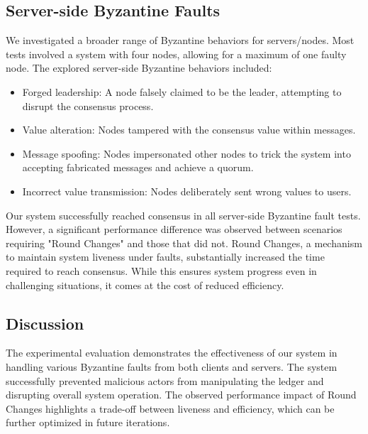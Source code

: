\subsection{Server-side Byzantine Faults} We investigated a broader range of Byzantine behaviors for servers/nodes. Most tests involved a system with four nodes, allowing for a maximum of one faulty node. The explored server-side Byzantine behaviors included:
    \begin{itemize}
        \item Forged leadership: A node falsely claimed to be the leader, attempting to disrupt the consensus process.
        \item Value alteration: Nodes tampered with the consensus value within messages.
        \item Message spoofing: Nodes impersonated other nodes to trick the system into accepting fabricated messages and achieve a quorum.
        \item Incorrect value transmission: Nodes deliberately sent wrong values to users.
    \end{itemize}

Our system successfully reached consensus in all server-side Byzantine fault tests. However, a significant performance difference was observed between scenarios requiring "Round Changes" and those that did not. Round Changes, a mechanism to maintain system liveness under faults, substantially increased the time required to reach consensus. While this ensures system progress even in challenging situations, it comes at the cost of reduced efficiency.

\subsection{Discussion}

The experimental evaluation demonstrates the effectiveness of our system in handling various Byzantine faults from both clients and servers. The system successfully prevented malicious actors from manipulating the ledger and disrupting overall system operation. The observed performance impact of Round Changes highlights a trade-off between liveness and efficiency, which can be further optimized in future iterations.






